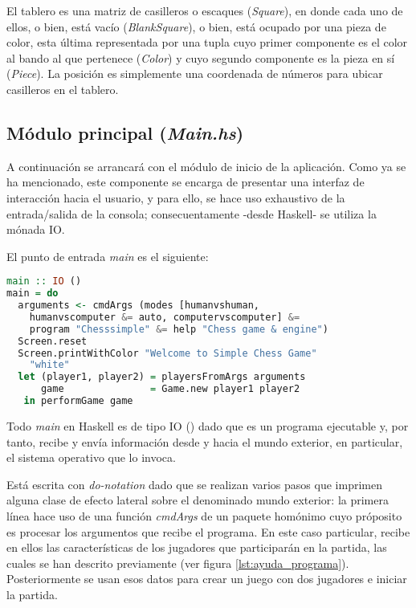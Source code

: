 \documentclass{llncs}
\begin{document}
El tablero es una matriz de casilleros o escaques (\textit{Square}), en donde cada uno de ellos, o bien, está vacío (\textit{BlankSquare}), o bien, está ocupado por una pieza de color, esta última representada por una tupla cuyo primer componente es el color al bando al que pertenece (\textit{Color}) y cuyo segundo componente es la pieza en sí (\textit{Piece}). La posición es simplemente una coordenada de números para ubicar casilleros en el tablero.

\subsection{Módulo principal (\textit{Main.hs})}

A continuación se arrancará con el módulo de inicio de la aplicación. Como ya se ha mencionado, este componente se encarga de presentar una interfaz de interacción hacia el usuario, y para ello, se hace uso exhaustivo de la entrada/salida de la consola; consecuentamente -desde Haskell- se utiliza la mónada IO.

El punto de entrada \textit{main} es el siguiente:

\begin{lstlisting}[frame=single, language=haskell, captionpos=b, caption=Punto de entrada de la aplicación, label={lst:punto_entrada}]
main :: IO ()
main = do
  arguments <- cmdArgs (modes [humanvshuman,
    humanvscomputer &= auto, computervscomputer] &=
    program "Chesssimple" &= help "Chess game & engine")
  Screen.reset
  Screen.printWithColor "Welcome to Simple Chess Game"
    "white"
  let (player1, player2) = playersFromArgs arguments
      game               = Game.new player1 player2
   in performGame game
\end{lstlisting}

Todo \textit{main} en Haskell es de tipo IO () dado que es un programa ejecutable y, por tanto, recibe y envía información desde y hacia el mundo exterior, en particular, el sistema operativo que lo invoca.

Está escrita con \textit{do-notation} dado que se realizan varios pasos que imprimen alguna clase de efecto lateral sobre el denominado mundo exterior: la primera línea hace uso de una función \textit{cmdArgs} de un paquete homónimo cuyo próposito es procesar los argumentos que recibe el programa. En este caso particular, recibe en ellos las características de los jugadores que participarán en la partida, las cuales se han descrito previamente (ver figura \ref{lst:ayuda_programa}). Posteriormente se usan esos datos para crear un juego con dos jugadores e iniciar la partida.
\end{document}

